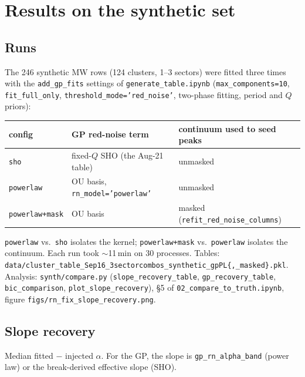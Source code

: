 \documentclass[11pt]{article}
\newcommand{\code}[1]{\texttt{#1}}
\begin{document}
\section{Results on the synthetic set}

\subsection{Runs}

The 246 synthetic MW rows (124 clusters, 1--3 sectors) were fitted three times with the
\code{add\_gp\_fits} settings of \code{generate\_table.ipynb} (\code{max\_components=10},
\code{fit\_full\_only}, \code{threshold\_mode='red\_noise'}, two-phase fitting, period and
$Q$ priors):

\begin{center}
\begin{tabular}{lll}
\toprule
config & GP red-noise term & continuum used to seed peaks \\
\midrule
\code{sho}            & fixed-$Q$ SHO (the Aug-21 table)     & unmasked \\
\code{powerlaw}       & OU basis, \code{rn\_model='powerlaw'} & unmasked \\
\code{powerlaw+mask}  & OU basis                              & masked (\code{refit\_red\_noise\_columns}) \\
\bottomrule
\end{tabular}
\end{center}

\code{powerlaw} vs.\ \code{sho} isolates the kernel; \code{powerlaw+mask} vs.\
\code{powerlaw} isolates the continuum. Each run took $\sim$11\,min on 30 processes.
Tables: \code{data/cluster\_table\_Sep16\_3sectorcombos\_synthetic\_gpPL\{,\_masked\}.pkl}.
Analysis: \code{synth/compare.py} (\code{slope\_recovery\_table},
\code{gp\_recovery\_table}, \code{bic\_comparison}, \code{plot\_slope\_recovery}),
\S5 of \code{02\_compare\_to\_truth.ipynb}, figure
\code{figs/rn\_fix\_slope\_recovery.png}.

\subsection{Slope recovery}

Median fitted $-$ injected $\alpha$. For the GP, the slope is \code{gp\_rn\_alpha\_band}
(power law) or the break-derived effective slope (SHO).
\end{document}
